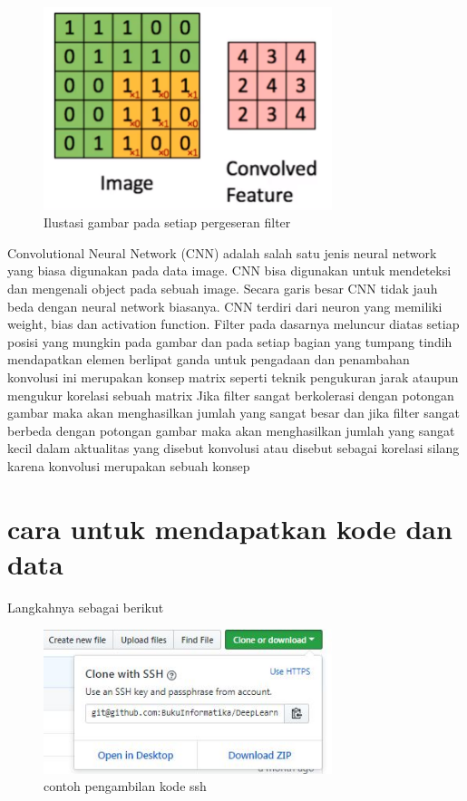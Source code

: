 \begin{figure}[!htp]
	\includegraphics[width=0.75\textwidth]{figures/convolusi.PNG}
	\caption{Ilustasi gambar pada setiap pergeseran filter}
	\label{labelgambar}
\end{figure}
	Convolutional Neural Network (CNN) adalah salah satu jenis neural network yang biasa digunakan pada data image. CNN bisa digunakan untuk mendeteksi dan mengenali object pada sebuah image.
Secara garis besar CNN tidak jauh beda dengan neural network biasanya. CNN terdiri dari neuron yang memiliki weight, bias dan activation function.
Filter pada dasarnya meluncur diatas setiap posisi yang mungkin pada gambar dan pada setiap bagian yang tumpang tindih mendapatkan elemen berlipat ganda untuk pengadaan dan penambahan konvolusi ini merupakan konsep matrix seperti teknik pengukuran jarak ataupun mengukur korelasi sebuah matrix 
Jika filter sangat berkolerasi dengan potongan gambar maka akan menghasilkan jumlah yang sangat besar dan jika filter sangat berbeda dengan potongan gambar maka akan menghasilkan jumlah yang sangat kecil dalam aktualitas yang disebut konvolusi atau disebut sebagai korelasi silang karena konvolusi merupakan sebuah konsep 


\section{cara untuk mendapatkan kode dan data}
Langkahnya sebagai berikut
\begin{figure}[!htp]
	\includegraphics[width=0.75\textwidth]{figures/ssh.JPG}
	\caption{contoh pengambilan kode ssh}
	\label{labelgambar}
\end{figure}

